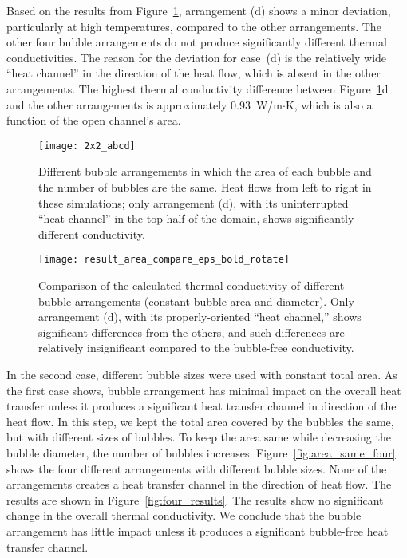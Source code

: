 Based on the results from Figure~\ref{fig:five_figures}, arrangement (d) shows a minor deviation, particularly at high temperatures, compared to the other arrangements. The other four bubble arrangements do not produce significantly different thermal conductivities. The reason for the deviation for case~(d) is the relatively wide ``heat channel'' in the direction of the heat flow, which is absent in the other arrangements. The highest thermal conductivity difference between Figure~\ref{fig:five_figures}d and the other arrangements is approximately 0.93~W/m$\cdot$K, which is also a function of the open channel's area.

\begin{figure}
	\centering
	\texttt{[image: 2x2\_abcd]}
    \caption[Different bubble arrangements in which the area of each bubble and
      the number of bubbles are the same]{Different bubble arrangements in which the area of each bubble and
      the number of bubbles are the same. Heat flows from left to right in
      these simulations; only arrangement (d), with its uninterrupted ``heat
      channel'' in the top half of the domain, shows significantly different
      conductivity.}
	\label{fig:five_figures} 
\end{figure}

\begin{figure}
	\centering
	\texttt{[image: result\_area\_compare\_eps\_bold\_rotate]}
    \caption[Comparison of the calculated thermal conductivity of different
        bubble arrangements (constant bubble area and diameter)]{Comparison of the calculated thermal conductivity of different
        bubble arrangements (constant bubble area and diameter). Only
        arrangement (d), with its properly-oriented ``heat channel,'' shows significant
        differences from the others, and such differences are relatively
        insignificant compared to the bubble-free conductivity.}
	\label{fig:five_results}
\end{figure}

In the second case, different bubble sizes were used with constant total area. As the first case shows, bubble arrangement has minimal impact on the overall heat transfer unless it produces a significant heat transfer channel in direction of the heat flow. In this step, we kept the total area covered by the bubbles the same, but with different sizes of bubbles. To keep the area same while decreasing the bubble diameter, the number of bubbles increases. Figure~\ref{fig:area_same_four} shows the four different arrangements with different bubble sizes. None of the arrangements creates a heat transfer channel in the direction of heat flow. The results are shown in Figure~\ref{fig:four_results}. The results show no significant change in the overall thermal conductivity. We conclude that the bubble arrangement has little impact unless it produces a significant bubble-free heat transfer channel. 

